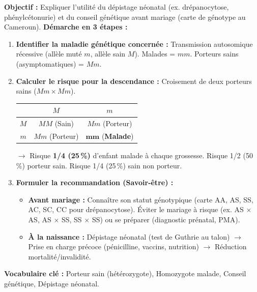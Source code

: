 \documentclass[11pt]{article}
\newcommand{\cle}[1]{{\popxbold\color{popdark}#1}}
\begin{document}
\begin{methode}
\textbf{Objectif :} Expliquer l'utilité du dépistage néonatal (ex. drépanocytose, phénylcétonurie) et du conseil génétique avant mariage (carte de génotype au Cameroun).
\textbf{Démarche en 3 étapes :}
\begin{enumerate}
    \item \textbf{Identifier la maladie génétique concernée :} Transmission autosomique récessive (allèle muté $m$, allèle sain $M$). Malades = $mm$. Porteurs sains (asymptomatiques) = $Mm$.
    \item \textbf{Calculer le risque pour la descendance :} Croisement de deux porteurs sains ($Mm \times Mm$).
    \begin{center}
    \begin{tabular}{|c|c|c|}\hline
    \rowcolor{popblueL} & $M$ & $m$ \\ \hline
    $M$ & $MM$ (Sain) & $Mm$ (Porteur) \\ \hline
    $m$ & $Mm$ (Porteur) & $\mathbf{mm}$ (\textbf{Malade}) \\ \hline
    \end{tabular}
    \end{center}
    $\rightarrow$ Risque \textbf{1/4 (25\,\%)} d'enfant malade à chaque grossesse. Risque 1/2 (50\,\%) porteur sain. Risque 1/4 (25\,\%) sain non porteur.
    \item \textbf{Formuler la recommandation (Savoir-être) :}
    \begin{itemize}
        \item \textbf{Avant mariage :} Connaître son \cle{statut génotypique} (carte AA, AS, SS, AC, SC, CC pour drépanocytose). Éviter le mariage à risque (ex. AS $\times$ AS, AS $\times$ SS, SS $\times$ SS) ou se préparer (diagnostic prénatal, PMA).
        \item \textbf{À la naissance :} Dépistage néonatal (test de Guthrie au talon) $\rightarrow$ Prise en charge précoce (pénicilline, vaccins, nutrition) $\rightarrow$ Réduction mortalité/invalidité.
    \end{itemize}
\end{enumerate}
\textbf{Vocabulaire clé :} \cle{Porteur sain (hétérozygote)}, \cle{Homozygote malade}, \cle{Conseil génétique}, \cle{Dépistage néonatal}.
\end{methode}
\end{document}
